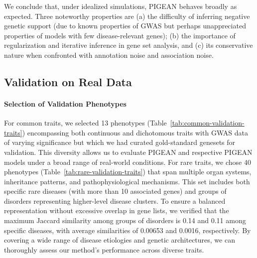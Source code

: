 We conclude that, under idealized simulations, PIGEAN behaves broadly as expected. Three noteworthy properties are (a) the difficulty of inferring negative genetic support (due to known properties of GWAS but perhaps unappreciated properties of models with few disease-relevant genes); (b) the importance of regularization and iterative inference in gene set analysis, and (c) its conservative nature when confronted with annotation noise and association noise.

\subsection{Validation on Real Data}
\paragraph{Selection of Validation Phenotypes}
For common traits, we selected 13 phenotypes (Table~\ref{tab:common-validation-traits}) encompassing both continuous and dichotomous traits with GWAS data of varying significance but which we had curated gold-standard genesets for validation. This diversity allows us to evaluate PIGEAN and respective PIGEAN models under a broad range of real-world conditions. For rare traits, we chose 40 phenotypes (Table~\ref{tab:rare-validation-traits}) that span multiple organ systems, inheritance patterns, and pathophysiological mechanisms. This set includes both specific rare diseases (with more than 10 associated genes) and groups of disorders representing higher-level disease clusters. To ensure a balanced representation without excessive overlap in gene lists, we verified that the maximum Jaccard similarity among groups of disorders is 0.14 and 0.11 among specific diseases, with average similarities of 0.00653 and 0.0016, respectively. By covering a wide range of disease etiologies and genetic architectures, we can thoroughly assess our method's performance across diverse traits.





